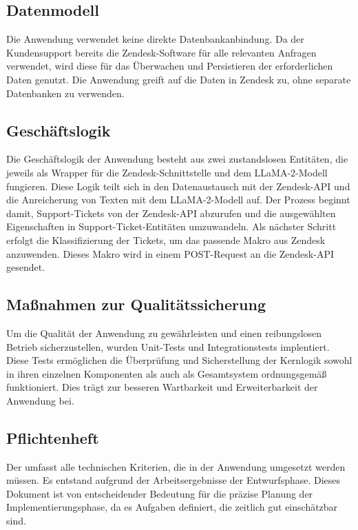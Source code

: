\subsection{Datenmodell}
\label{sec:Datenmodell}
Die Anwendung verwendet keine direkte Datenbankanbindung. 
Da der Kundensupport bereits die Zendesk-Software für alle relevanten
Anfragen verwendet, wird diese für das Überwachen und Persistieren  der 
erforderlichen Daten genutzt. Die Anwendung greift auf die Daten in 
Zendesk zu, ohne separate Datenbanken zu verwenden.





\subsection{Geschäftslogik}
\label{sec:Geschaeftslogik}
Die Geschäftslogik der Anwendung besteht aus zwei zustandslosen 
Entitäten, die jeweils als Wrapper für die Zendesk-Schnittstelle und dem \ac{LLaMA}-2-Modell fungieren. Diese Logik 
teilt sich in den Datenaustausch mit der Zendesk-\ac{API} und die 
Anreicherung von Texten mit dem \ac{LLaMA}-2-Modell auf.
Der Prozess beginnt damit, Support-Tickets von der Zendesk-\ac{API} 
abzurufen und die ausgewählten Eigenschaften in Support-Ticket-Entitäten 
umzuwandeln. Als nächster Schritt erfolgt die Klassifizierung der Tickets,
um das passende Makro aus Zendesk anzuwenden. Dieses Makro
wird in einem POST-Request an die Zendesk-\ac{API} gesendet.




\subsection{Maßnahmen zur Qualitätssicherung}
Um die Qualität der Anwendung zu gewährleisten und einen reibungslosen Betrieb
sicherzustellen, wurden Unit-Tests und Integrationstests implentiert. 
Diese Tests ermöglichen die Überprüfung und Sicherstellung 
der Kernlogik sowohl in ihren einzelnen Komponenten als auch als 
Gesamtsystem ordnungsgemäß funktioniert.
Dies trägt zur besseren Wartbarkeit und Erweiterbarkeit der Anwendung bei.


\subsection{Pflichtenheft}
Der  umfasst alle technischen Kriterien, die in der Anwendung
umgesetzt werden müssen. Es entstand aufgrund der Arbeitsergebnisse der 
Entwurfsphase. Dieses Dokument ist von entscheidender Bedeutung für
die präzise Planung der Implementierungsphase, da es Aufgaben definiert, die zeitlich gut einschätzbar sind.
